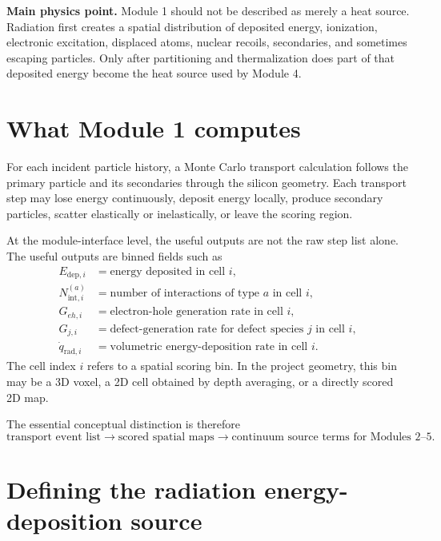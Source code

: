 \documentclass[11pt]{article}
\begin{document}
\begin{physicsbox}
\textbf{Main physics point.} Module 1 should not be described as merely a heat source. Radiation first creates a spatial distribution of deposited energy, ionization, electronic excitation, displaced atoms, nuclear recoils, secondaries, and sometimes escaping particles. Only after partitioning and thermalization does part of that deposited energy become the heat source used by Module 4.
\end{physicsbox}

\section{What Module 1 computes}

For each incident particle history, a Monte Carlo transport calculation follows the primary particle and its secondaries through the silicon geometry. Each transport step may lose energy continuously, deposit energy locally, produce secondary particles, scatter elastically or inelastically, or leave the scoring region.

At the module-interface level, the useful outputs are not the raw step list alone. The useful outputs are binned fields such as
\begin{align}
E_{\mathrm{dep},i} &= \text{energy deposited in cell } i, \\
N_{\mathrm{int},i}^{(a)} &= \text{number of interactions of type } a \text{ in cell } i, \\
G_{eh,i} &= \text{electron-hole generation rate in cell } i, \\
G_{j,i} &= \text{defect-generation rate for defect species } j \text{ in cell } i, \\
\dot{q}_{\mathrm{rad},i} &= \text{volumetric energy-deposition rate in cell } i.
\end{align}
The cell index $i$ refers to a spatial scoring bin. In the project geometry, this bin may be a 3D voxel, a 2D cell obtained by depth averaging, or a directly scored 2D map.

The essential conceptual distinction is therefore
\begin{equation}
\text{transport event list}
\longrightarrow
\text{scored spatial maps}
\longrightarrow
\text{continuum source terms for Modules 2--5}.
\end{equation}

\section{Defining the radiation energy-deposition source}
\end{document}
